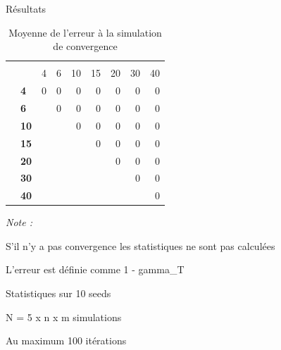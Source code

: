 \documentclass[10pt,xcolor=table,color={dvipsnames,usenames},ignorenonframetext,usepdftitle=false,french]{beamer}
\begin{document}
\begin{frame}{Résultats}
\protect\hypertarget{ruxe9sultats-6}{}

\begin{table}

\caption{\label{tab:tabq2erreur}Moyenne de l'erreur à la simulation de convergence}
\centering
\begin{threeparttable}
\begin{tabular}[t]{>{\bfseries}l|>{\bfseries}l|r|r|r|r|r|r|r}
\hline
\multicolumn{2}{c|}{ } & \multicolumn{7}{c}{m} \\
\cline{3-9}
  &    & 4 & 6 & 10 & 15 & 20 & 30 & 40\\
\hline
 & 4 & 0 & 0 & 0 & 0 & 0 & 0 & 0\\
\cline{2-9}
 & 6 &  & 0 & 0 & 0 & 0 & 0 & 0\\
\cline{2-9}
 & 10 &  &  & 0 & 0 & 0 & 0 & 0\\
\cline{2-9}
 & 15 &  &  &  & 0 & 0 & 0 & 0\\
\cline{2-9}
 & 20 &  &  &  &  & 0 & 0 & 0\\
\cline{2-9}
 & 30 &  &  &  &  &  & 0 & 0\\
\cline{2-9}
\multirow{-7}{*}{\raggedright\arraybackslash n} & 40 &  &  &  &  &  &  & 0\\
\hline
\end{tabular}
\begin{tablenotes}
\item \textit{Note : } 
\item S'il n'y a pas convergence les statistiques ne sont pas calculées
\item L'erreur est définie comme 1 - gamma\_T
\item Statistiques sur 10 seeds
\item N = 5 x n x m simulations
\item Au maximum 100 itérations
\end{tablenotes}
\end{threeparttable}
\end{table}

\end{frame}
\end{document}
